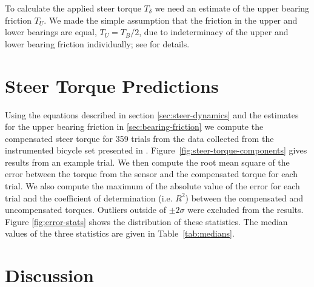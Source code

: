 \documentclass[10pt]{article}
\begin{document}
To calculate the applied steer torque $T_\delta$ we need an estimate of the
upper bearing friction $T_U$. We made the simple assumption that the friction
in the upper and lower bearings are equal, $T_U = T_B / 2$, due to
indeterminacy of the upper and lower bearing friction individually; see
\cite{Moore2012} for details.

\section*{Steer Torque Predictions}

Using the equations described in section \ref{sec:steer-dynamics} and the
estimates for the upper bearing friction in \ref{sec:bearing-friction} we
compute the compensated steer torque for 359 trials from the data collected
from the instrumented bicycle set presented in \cite{Moore2012}.
Figure~\ref{fig:steer-torque-components} gives results from an example trial.
We then compute the root mean square of the error between the torque from the
sensor and the compensated torque for each trial. We also compute the maximum
of the absolute value of the error for each trial and the coefficient of
determination (i.e. $R^2$) between the compensated and uncompensated torques.
Outliers outside of $\pm2 \sigma$ were excluded from the results. Figure
\ref{fig:error-stats} shows the distribution of these statistics. The median
values of the three statistics are given in Table~\ref{tab:medians}.

\section*{Discussion}
\end{document}
